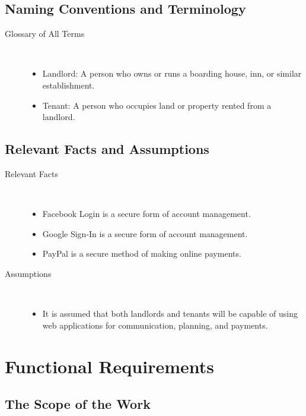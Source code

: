 \documentclass[12pt, titlepage]{article}
\begin{document}
\subsection{Naming Conventions and Terminology} %
\begin{description}
  \item[Glossary of All Terms] \hfill \\
    \begin{itemize}
    \item Landlord: A person who owns or runs a boarding house, inn, or similar
      establishment.
    \item Tenant: A person who occupies land or property rented from a landlord.
    \end{itemize}
\end{description}
\subsection{Relevant Facts and Assumptions} %
\begin{description}
  \item[Relevant Facts] \hfill \\
  \begin{itemize}
    \item Facebook Login is a secure form of account management.
    \item Google Sign-In is a secure form of account management.
    \item PayPal is a secure method of making online payments.
  \end{itemize}
  \item[Assumptions] \hfill \\
  \begin{itemize}
  \item  It is assumed that both landlords and tenants will be capable of using
    web applications for communication, planning, and payments.
  \end{itemize}
\end{description}  

\section{Functional Requirements} 
\subsection{The Scope of the Work}
\end{document}
